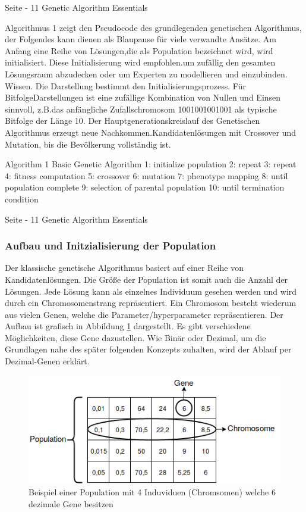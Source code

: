Seite - 11 Genetic Algorithm Essentials


Algorithmus 1 zeigt den Pseudocode des grundlegenden genetischen Algorithmus, der Folgendes kann dienen als Blaupause für viele verwandte Ansätze. Am Anfang eine Reihe von Lösungen,die als Population bezeichnet wird, wird initialisiert. Diese Initialisierung wird empfohlen.um zufällig den gesamten Lösungsraum abzudecken oder um Experten zu modellieren und einzubinden. Wissen. Die Darstellung bestimmt den Initialisierungsprozess. Für BitfolgeDarstellungen ist eine zufällige Kombination von Nullen und Einsen sinnvoll, z.B.das anfängliche Zufallschromosom 1001001001001 als typische Bitfolge der Länge 10. Der Hauptgenerationskreislauf des Genetischen Algorithmus erzeugt neue Nachkommen.Kandidatenlösungen mit Crossover und Mutation, bis die Bevölkerung vollständig ist.

Algorithm 1 Basic Genetic Algorithm
1: initialize population
2: repeat
3: 		repeat
4:			fitness computation
5:			crossover
6:			mutation
7:			phenotype mapping
8:		until population complete
9:		selection of parental population
10: until termination condition

Seite - 11 Genetic Algorithm Essentials
\fi 

\subsubsection{Aufbau und Initzialisierung der Population}
Der klassische genetische Algorithmus basiert auf einer Reihe von Kandidatenlösungen. Die Größe der Population ist somit auch die Anzahl der Lösungen. Jede Lösung kann als einzelnes Individuum gesehen werden und wird durch ein Chromosomenstrang repräsentiert. Ein Chromosom besteht wiederum aus vielen Genen, welche die Parameter/hyperparameter repräsentieren. Der Aufbau ist grafisch in Abbildung \ref{fig:population} dargestellt. Es gibt verschiedene Möglichkeiten, diese Gene dazustellen. Wie Binär oder Dezimal, um die Grundlagen nahe des später folgenden Konzepts zuhalten, wird der Ablauf per Dezimal-Genen erklärt.




\noindent%
\begin{figure}[H]
  \centering  
  \includegraphics[scale=0.7]{img/population.png}
  \caption{Beispiel einer Population mit 4 Induviduen (Chromsomen) welche 6 dezimale Gene besitzen}
  \label{fig:population}
\end{figure}

